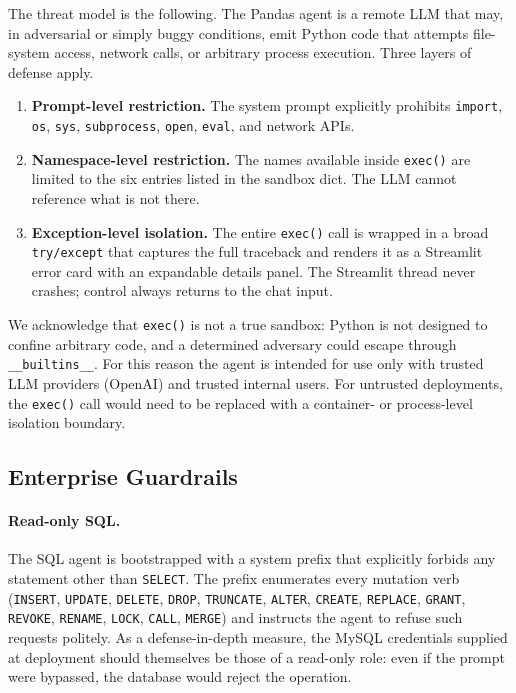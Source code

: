 \documentclass[11pt,a4paper]{article}
\begin{document}
The threat model is the following. The Pandas agent is a remote LLM
that may, in adversarial or simply buggy conditions, emit Python code
that attempts file-system access, network calls, or arbitrary process
execution. Three layers of defense apply.
\begin{enumerate}
  \item \textbf{Prompt-level restriction.} The system prompt explicitly
        prohibits \texttt{import}, \texttt{os}, \texttt{sys},
        \texttt{subprocess}, \texttt{open}, \texttt{eval}, and network
        APIs.
  \item \textbf{Namespace-level restriction.} The names available
        inside \texttt{exec()} are limited to the six entries listed
        in the sandbox dict. The LLM cannot reference what is not
        there.
  \item \textbf{Exception-level isolation.} The entire \texttt{exec()}
        call is wrapped in a broad \texttt{try/except} that captures
        the full traceback and renders it as a Streamlit error card
        with an expandable details panel. The Streamlit thread never
        crashes; control always returns to the chat input.
\end{enumerate}

We acknowledge that \texttt{exec()} is not a true sandbox: Python is
not designed to confine arbitrary code, and a determined adversary
could escape through \texttt{\_\_builtins\_\_}. For this reason the
agent is intended for use only with trusted LLM providers (OpenAI) and
trusted internal users. For untrusted deployments, the
\texttt{exec()} call would need to be replaced with a container- or
process-level isolation boundary.

\subsection{Enterprise Guardrails}

\paragraph{Read-only SQL.}
The SQL agent is bootstrapped with a system prefix that explicitly
forbids any statement other than \texttt{SELECT}. The prefix
enumerates every mutation verb (\texttt{INSERT}, \texttt{UPDATE},
\texttt{DELETE}, \texttt{DROP}, \texttt{TRUNCATE}, \texttt{ALTER},
\texttt{CREATE}, \texttt{REPLACE}, \texttt{GRANT}, \texttt{REVOKE},
\texttt{RENAME}, \texttt{LOCK}, \texttt{CALL}, \texttt{MERGE}) and
instructs the agent to refuse such requests politely. As a
defense-in-depth measure, the MySQL credentials supplied at deployment
should themselves be those of a read-only role: even if the prompt
were bypassed, the database would reject the operation.
\end{document}
